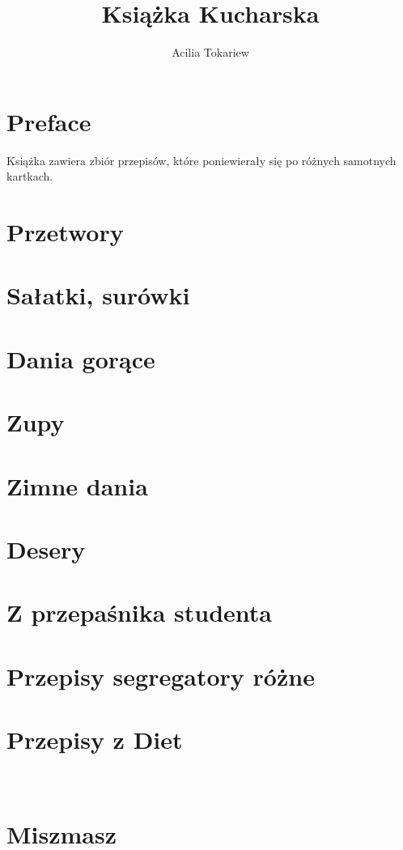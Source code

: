 \documentclass[14pt,twoside,parskip=half*]{scrbook}
\title{Książka Kucharska}
\author{Acilia Tokariew}
\begin{document}
\frontmatter{}
\maketitle{}
\tableofcontents{}
\chapter{Preface}
Książka zawiera zbiór przepisów, które poniewierały się po różnych samotnych
kartkach.

\mainmatter{}

\chapter{Przetwory}

\label{ch:przetwory}

\chapter{Sałatki, surówki}

\label{ch:salatki-surowki}

\chapter{Dania gorące}

\label{ch:dania-gorace}

\chapter{Zupy}

\label{ch:zupy}

\chapter{Zimne dania}

\label{ch:zimne-dania}

\chapter{Desery}

\label{ch:desery}

\chapter{Z przepaśnika studenta}

\label{ch:przepasnik-student}

\chapter{Przepisy segregatory różne}

\label{ch:przepisy-segregatory}

\chapter{Przepisy z Diet}

\label{ch:przepisy-diety}
\
\chapter{Miszmasz}

\label{ch:miszmasz}
\end{document}
